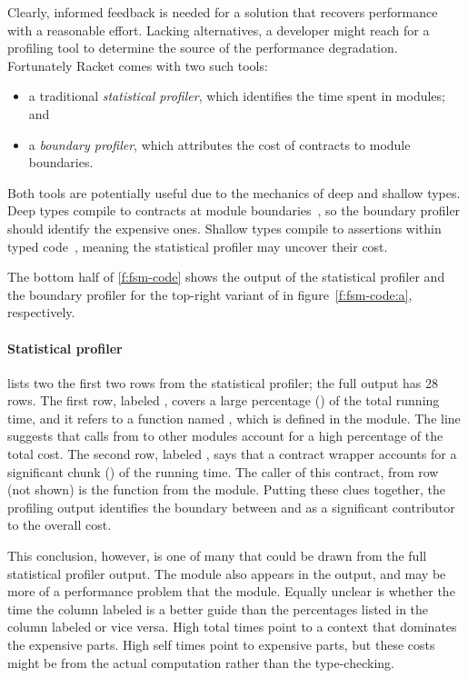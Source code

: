 Clearly, informed feedback is needed for a solution that recovers performance
with a reasonable effort. Lacking alternatives, a developer might reach for a
profiling tool to determine the source of the performance
degradation. Fortunately Racket comes with two such tools: 
\begin{itemize}

\item a traditional \emph{statistical profiler}, which identifies the time spent
 in modules; and

\item a \emph{boundary profiler}, which  attributes the cost of contracts to
 module boundaries.
 
\end{itemize}
Both tools are potentially useful due to the mechanics of deep and shallow types.
Deep types compile to contracts at module boundaries~\cite{tf-popl-2008}, so
the boundary profiler should identify the expensive ones. 
Shallow types compile to assertions within typed code~\cite{glfd-pj-2022},
meaning the statistical profiler may uncover their cost. 

The bottom half of \cref{f:fsm-code} shows the output of the statistical
profiler and the boundary profiler for the top-right variant of  in
figure~\ref{f:fsm-code:a}, respectively.

\paragraph{Statistical profiler}  lists two the
first two rows from the statistical profiler; the full output has 28 rows.  The
first row, labeled \code{[17]}, covers a large percentage () of the
total running time, and it refers to a function named , which is
defined in the  module. The line suggests that calls from
 to other modules account for a high percentage of the total cost.
The second row, labeled \code{[24]}, says that a contract wrapper accounts for a
significant chunk () of the running time.  The caller of this
contract, from row \code{[19]} (not shown) is the function 
from the  module.  Putting these clues together, the profiling output
identifies the boundary between  and  as a significant
contributor to the overall cost. 

This conclusion, however, is one of many that could be drawn from the full
statistical profiler output.  The  module also appears in the output,
and may be more of a performance problem that the  module.  Equally
unclear is whether the time the column labeled  is a better guide than
the percentages listed in the column labeled  or vice versa.  High
total times point to a context that dominates the expensive parts.  High self
times point to expensive parts, but these costs might be from the actual
computation rather than the type-checking.

